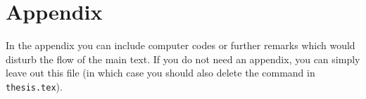 \chapter{Appendix}\label{ch:appendix}

In the appendix you can include \eg computer codes or further remarks which would disturb the flow of the main text. If you do not need an appendix, you can simply leave out this file (in which case you should also delete the \verb|| command in \texttt{thesis.tex}).